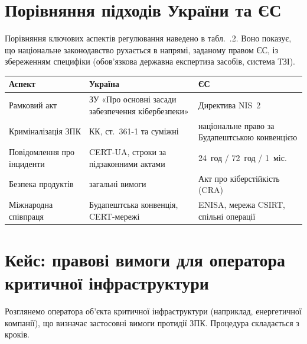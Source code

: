 \section{Порівняння підходів України та ЄС}\label{sec:ch02-compare}

Порівняння ключових аспектів регулювання наведено в табл.~\thechapter.2. Воно показує, що національне законодавство рухається в напрямі, заданому правом ЄС, із збереженням специфіки (обов'язкова державна експертиза засобів, система ТЗІ).


\begin{center}\footnotesize
\begin{tabularx}{\linewidth}{L{20mm} Y Y}
\toprule
Аспект & Україна & ЄС \\
\midrule
Рамковий акт & ЗУ «Про основні засади забезпечення кібербезпеки» & Директива NIS~2 \\
Криміналізація ЗПК & КК, ст.~361-1 та суміжні & національне право за Будапештською конвенцією \\
Повідомлення про інциденти & CERT-UA, строки за підзаконними актами & 24~год / 72~год / 1~міс. \\
Безпека продуктів & загальні вимоги & Акт про кіберстійкість (CRA) \\
Міжнародна співпраця & Будапештська конвенція, CERT-мережі & ENISA, мережа CSIRT, спільні операції \\
\bottomrule
\end{tabularx}
\end{center}

\section{Кейс: правові вимоги для оператора критичної інфраструктури}\label{sec:ch02-case}

Розглянемо оператора об'єкта критичної інфраструктури (наприклад, енергетичної компанії), що визначає застосовні вимоги протидії ЗПК. Процедура складається з кроків.

